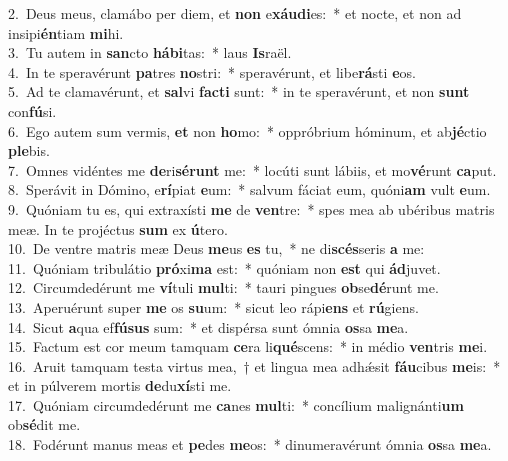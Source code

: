 {2.~}Deus meus, clamábo per diem, et \textbf{non} e\textbf{xáu}\textbf{di}es:~* et nocte, et non ad insipi\textbf{én}tiam \textbf{mi}hi.\\
{3.~}Tu autem in \textbf{san}cto \textbf{há}\textbf{bi}tas:~* laus \textbf{Is}raël.\\
{4.~}In te speravérunt \textbf{pa}tres \textbf{no}stri:~* speravérunt, et libe\textbf{rá}sti \textbf{e}os.\\
{5.~}Ad te clamavérunt, et \textbf{sal}vi \textbf{fa}\textbf{cti} sunt:~* in te speravérunt, et non \textbf{sunt} con\textbf{fú}si.\\
{6.~}Ego autem sum vermis, \textbf{et} non \textbf{ho}mo:~* oppróbrium hóminum, et ab\textbf{jé}ctio \textbf{ple}bis.\\
{7.~}Omnes vidéntes me \textbf{de}ri\textbf{sé}\textbf{runt} me:~* locúti sunt lábiis, et mo\textbf{vé}runt \textbf{ca}put.\\
{8.~}Sperávit in Dómino, e\textbf{rí}piat \textbf{e}um:~* salvum fáciat eum, quóni\textbf{am} vult \textbf{e}um.\\
{9.~}Quóniam tu es, qui extraxísti \textbf{me} de \textbf{ven}tre:~* spes mea ab ubéribus matris meæ. In te projéctus \textbf{sum} ex \textbf{ú}tero.\\
{10.~}De ventre matris meæ Deus \textbf{me}us \textbf{es} tu,~* ne di\textbf{scés}seris \textbf{a} me:\\
{11.~}Quóniam tribulátio \textbf{pró}xi\textbf{ma} est:~* quóniam non \textbf{est} qui \textbf{ád}juvet.\\
{12.~}Circumdedérunt me \textbf{ví}tuli \textbf{mul}ti:~* tauri pingues \textbf{ob}se\textbf{dé}runt me.\\
{13.~}Aperuérunt super \textbf{me} os \textbf{su}um:~* sicut leo rápi\textbf{ens} et \textbf{rú}giens.\\
{14.~}Sicut \textbf{a}qua ef\textbf{fú}\textbf{sus} sum:~* et dispérsa sunt ómnia \textbf{os}sa \textbf{me}a.\\
{15.~}Factum est cor meum tamquam \textbf{ce}ra li\textbf{qué}scens:~* in médio \textbf{ven}tris \textbf{me}i.\\
{16.~}Aruit tamquam testa virtus mea,~† et lingua mea adhǽsit \textbf{fáu}cibus \textbf{me}is:~* et in púlverem mortis \textbf{de}du\textbf{xí}sti me.\\
{17.~}Quóniam circumdedérunt me \textbf{ca}nes \textbf{mul}ti:~* concílium malignánti\textbf{um} ob\textbf{sé}dit me.\\
{18.~}Fodérunt manus meas et \textbf{pe}des \textbf{me}os:~* dinumeravérunt ómnia \textbf{os}sa \textbf{me}a.\\
